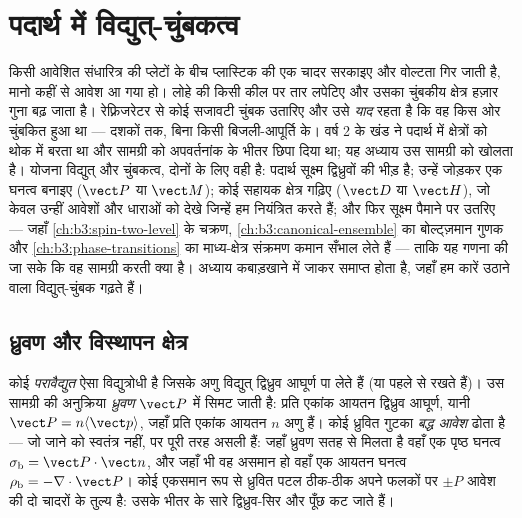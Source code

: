 \chapter{पदार्थ में विद्युत्-चुंबकत्व}\label{ch:b3:electromagnetism-in-matter}


किसी आवेशित संधारित्र की प्लेटों के बीच प्लास्टिक की एक चादर सरकाइए
और वोल्टता गिर जाती है, मानो कहीं से आवेश आ गया हो। लोहे की किसी कील
पर तार लपेटिए और उसका चुंबकीय क्षेत्र हज़ार गुना बढ़ जाता है।
रेफ़्रिजरेटर से कोई सजावटी चुंबक उतारिए और उसे \emph{याद} रहता है कि
वह किस ओर चुंबकित हुआ था --- दशकों तक, बिना किसी बिजली-आपूर्ति के।
वर्ष 2 के खंड ने पदार्थ में क्षेत्रों को थोक में बरता था और सामग्री
को अपवर्तनांक के भीतर छिपा दिया था; यह अध्याय उस सामग्री को खोलता है।
योजना विद्युत् और चुंबकत्व, दोनों के लिए वही है: पदार्थ सूक्ष्म
द्विध्रुवों की भीड़ है; उन्हें जोड़कर एक घनत्व बनाइए ($\vect P$ या
$\vect M$); कोई सहायक क्षेत्र गढ़िए ($\vect D$ या $\vect H$), जो केवल
उन्हीं आवेशों और धाराओं को देखे जिन्हें हम नियंत्रित करते हैं; और फिर
सूक्ष्म पैमाने पर उतरिए --- जहाँ \cref{ch:b3:spin-two-level} के चक्रण,
\cref{ch:b3:canonical-ensemble} का बोल्ट्ज़मान गुणक और
\cref{ch:b3:phase-transitions} का माध्य-क्षेत्र संक्रमण कमान सँभाल
लेते हैं --- ताकि यह गणना की जा सके कि वह सामग्री करती क्या है। अध्याय
कबाड़खाने में जाकर समाप्त होता है, जहाँ हम कारें उठाने वाला
विद्युत्-चुंबक गढ़ते हैं।

\section{ध्रुवण और विस्थापन क्षेत्र}

\begin{definition}[ध्रुवण और बद्ध आवेश]\label{def:b3:electromagnetism-in-matter:polarisation}
कोई \emph{परावैद्युत} ऐसा विद्युत्रोधी है जिसके अणु विद्युत्
द्विध्रुव आघूर्ण पा लेते हैं (या पहले से रखते हैं)। उस सामग्री की
अनुक्रिया \emph{ध्रुवण} $\vect P$ में सिमट जाती है: प्रति एकांक आयतन
द्विध्रुव आघूर्ण, यानी $\vect P = n\langle\vect p\rangle$, जहाँ
प्रति एकांक आयतन $n$ अणु हैं। कोई ध्रुवित गुटका \emph{बद्ध आवेश}
ढोता है --- जो जाने को स्वतंत्र नहीं, पर पूरी तरह असली हैं: जहाँ ध्रुवण
सतह से मिलता है वहाँ एक पृष्ठ घनत्व
$\sigma_{\text{b}} = \vect P\cdot\vect n$, और जहाँ भी वह असमान हो वहाँ
एक आयतन घनत्व $\rho_{\text{b}} =
-\nabla\cdot\vect P$। कोई एकसमान रूप से
ध्रुवित पटल ठीक-ठीक अपने फलकों पर $\pm P$ आवेश की दो चादरों के तुल्य
है: उसके भीतर के सारे द्विध्रुव-सिर और पूँछ कट जाते हैं।
\end{definition}

